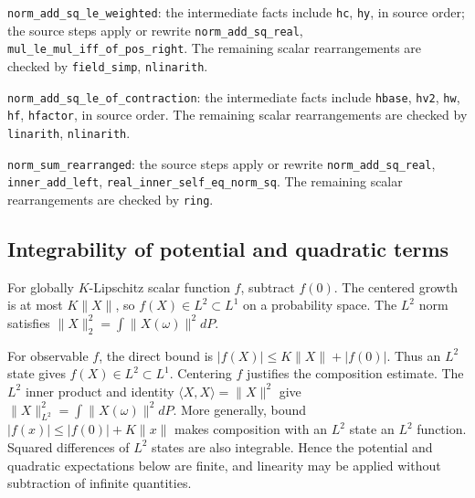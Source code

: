 \documentclass[11pt,a4paper]{report}
\begin{document}
\begin{leanbox}
\texttt{norm\_\allowbreak{}add\_\allowbreak{}sq\_\allowbreak{}le\_\allowbreak{}weighted}: the intermediate facts include \texttt{hc}, \texttt{hy}, in source order; the source steps apply or rewrite \texttt{norm\_\allowbreak{}add\_\allowbreak{}sq\_\allowbreak{}real}, \texttt{mul\_\allowbreak{}le\_\allowbreak{}mul\_\allowbreak{}iff\_\allowbreak{}of\_\allowbreak{}pos\_\allowbreak{}right}. The remaining scalar rearrangements are checked by \texttt{field\_\allowbreak{}simp}, \texttt{nlinarith}.



\texttt{norm\_\allowbreak{}add\_\allowbreak{}sq\_\allowbreak{}le\_\allowbreak{}of\_\allowbreak{}contraction}: the intermediate facts include \texttt{hbase}, \texttt{hv2}, \texttt{hw}, \texttt{hf}, \texttt{hfactor}, in source order. The remaining scalar rearrangements are checked by \texttt{linarith}, \texttt{nlinarith}.



\texttt{norm\_\allowbreak{}sum\_\allowbreak{}rearranged}: the source steps apply or rewrite \texttt{norm\_\allowbreak{}add\_\allowbreak{}sq\_\allowbreak{}real}, \texttt{inner\_\allowbreak{}add\_\allowbreak{}left}, \texttt{real\_\allowbreak{}inner\_\allowbreak{}self\_\allowbreak{}eq\_\allowbreak{}norm\_\allowbreak{}sq}. The remaining scalar rearrangements are checked by \texttt{ring}.
\end{leanbox}
\subsection{\texorpdfstring{Integrability of potential and quadratic terms}{Integrability of potential and quadratic terms}}
\label{report-step-ProximalLangevin-SplittingL2Energy-lean-2}


For globally \(K\)-Lipschitz scalar function \(f\), subtract \(f(0)\). The centered growth is at most \(K\|X\|\), so \(f(X)\in L^2\subset L^1\) on a probability space. The \(L^2\) norm satisfies \(\|X\|_2^2=\int\|X(\omega)\|^2dP\).



For observable \(f\), the direct bound is \(|f(X)|\le K\|X\|+|f(0)|\). Thus an \(L^2\) state gives \(f(X)\in L^2\subset L^1\). Centering \(f\) justifies the composition estimate. The \(L^2\) inner product and identity \(\langle X,X\rangle=\|X\|^2\) give \(\|X\|_{L^2}^2=\int\|X(\omega)\|^2dP\). More generally, bound \(|f(x)|\le|f(0)|+K\|x\|\) makes composition with an \(L^2\) state an \(L^2\) function. Squared differences of \(L^2\) states are also integrable. Hence the potential and quadratic expectations below are finite, and linearity may be applied without subtraction of infinite quantities.
\end{document}
